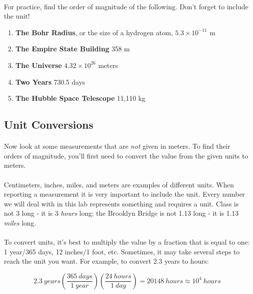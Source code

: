 \documentclass[12pt]{article}
\begin{document}
\begin{flushleft}
\paragraph{}
For practice, find the order of magnitude of the following.  Don't forget to include the unit!
\begin{enumerate}
\item \textbf{The Bohr Radius}, or the size of a hydrogen atom, $5.3 \times 10^{-11}$ m %
\item \textbf{The Empire State Building} 358 m %
\item \textbf{The Universe} $4.32 \times 10^{26}$ meters
\item \textbf{Two Years} 730.5 days
\item \textbf{The Hubble Space Telescope} 11,110 kg
\end{enumerate}

\subsection{Unit Conversions}
\paragraph{}
Now look at some measurements that are \emph{not} given in meters.  To find their orders of magnitude, you'll first need to convert the value from the given units to meters.  
\paragraph{}
Centimeters, inches, miles, and meters are examples of different units.  When reporting a measurement it is very important to include the unit.  Every number we will deal with in this lab represents something and requires a unit.  Class is not 3 long - it is 3 \emph{hours} long; the Brooklyn Bridge is not 1.13 long - it is 1.13 \emph{miles} long.  
\paragraph{}
To convert units, it's best to multiply the value by a fraction that is equal to one: 1 year/365 days, 12 inches/1 foot, etc.  Sometimes, it may take several steps to reach the unit you want.  For example, to convert 2.3 years to hours:

\begin{equation}
2.3~years \left(\frac{365~days}{1~year}\right) \left(\frac{24~hours}{1~day}\right) = 20148~hours \approx 10^4~hours
\end{equation}


\end{flushleft}
\end{document}
